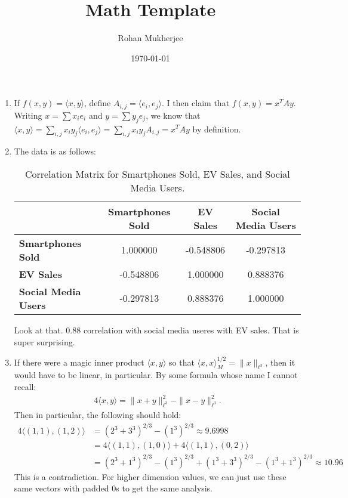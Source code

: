 \documentclass[12pt]{article}
\title{Math Template}
\date{\today}
\author{Rohan Mukherjee}
\theoremstyle{definitionstyle}
\newcommand{\mg}[1]{\| #1 \|}
\renewcommand{\ip}[1]{\langle#1\rangle}
\newcommand{\1}{\mathds 1}
\begin{document}
    \maketitle
    \begin{enumerate}
        \item If $f(x,y) = \ip{x,y}$, define $A_{i,j} = \ip{e_i, e_j}$. I then claim that $f(x,y) = x^T Ay$. Writing $x = \sum x_i e_i$ and $y = \sum y_j e_j$, we know that $\ip{x,y} = \sum_{i,j} x_i y_j \ip{e_i,e_j} = \sum_{i,j} x_iy_j A_{i,j} = x^T Ay$ by definition.

        \item The data is as follows:
        \begin{table}[h!]
            \centering
            \begin{tabular}{lccc}
            \toprule
             & \textbf{Smartphones Sold} & \textbf{EV Sales} & \textbf{Social Media Users} \\
            \midrule
            \textbf{Smartphones Sold} & 1.000000 & -0.548806 & -0.297813 \\
            \textbf{EV Sales} & -0.548806 & 1.000000 & 0.888376 \\
            \textbf{Social Media Users} & -0.297813 & 0.888376 & 1.000000 \\
            \bottomrule
            \end{tabular}
            \caption{Correlation Matrix for Smartphones Sold, EV Sales, and Social Media Users.}
            \label{tab:correlation_matrix}
        \end{table}

        Look at that. 0.88 correlation with social media useres with EV sales. That is super surprising.

        \item If there were a magic inner product $\ip{x,y}$ so that $\ip{x,x}_M^{1/2} = \mg{x}_{\ell^3}$, then it would have to be linear, in particular. By some formula whose name I cannot recall:
        \begin{align*}
            4\ip{x,y} = \mg{x+y}_{\ell^3}^2 - \mg{x-y}_{\ell^3}^2. 
        \end{align*}
        Then in particular, the following should hold:
        \begin{align*}
            4\ip{(1,1), (1,2)} &= (2^3 + 3^3)^{2/3} - (1^3)^{2/3} \approx 9.6998 \\
            &= 4\ip{(1,1), (1,0)} + 4\ip{(1,1), (0,2)} \\
            &= (2^3+1^3)^{2/3} - (1^3)^{2/3} + (1^3 + 3^3)^{2/3} - (1^3+1^3)^{2/3} \approx 10.96
        \end{align*}
        This is a contradiction. For higher dimension values, we can just use these same vectors with padded 0s to get the same analysis.



\end{enumerate}
\end{document}

